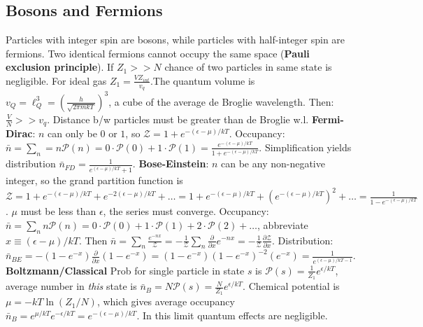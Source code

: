 \documentclass[11pt,twocolumn]{amsart}
\begin{document}
\subsection{Bosons and Fermions}
Particles with integer spin are bosons, while particles with half-integer spin are fermions. Two identical fermions cannot occupy the same space (\textbf{Pauli exclusion principle}). If $Z_1 >> N$ chance of two particles in same state is negligible. For ideal gas $Z_1 = \frac{V Z_{int}}{v_q} $.The quantum volume is $ v_Q = \ell_Q^3 = \left( \frac{h}{\sqrt{2\pi mkT}} \right)^3 $, a cube of the average de Broglie wavelength. Then: $ \frac{V}{N} >>v_q$. Distance b/w particles must be greater than de Broglie w.l.
\textbf{Fermi-Dirac}: $n$ can only be $0$ or $1$, so $\mathcal{Z} = 1 + e^{-(\epsilon-\mu)/kT}$. Occupancy: $ \bar{n} = \sum_n = n\mathcal{P}(n) = 0 \cdot \mathcal{P}(0) + 1 \cdot \mathcal{P}(1) = \frac{e^{-(\epsilon - \mu)/kT}}{1 + e^{-(\epsilon - \mu)/kT}} $. Simplification yields distribution $\bar{n}_{FD} = \frac{1}{e^{(\epsilon-\mu)/kT} + 1} $.
\textbf{Bose-Einstein}: $n$ can be any non-negative integer, so the grand partition function is $ \mathcal{Z} = 1 + e^{-(\epsilon-\mu)/kT} + e^{-2(\epsilon-\mu)/kT} + \dots = 1 + e^{-(\epsilon-\mu)/kT} + (e^{-(\epsilon-\mu)/kT})^2 + \dots = \frac{1}{1-e^{-(\epsilon-\mu)/kT}}$. $\mu$ must be less than $\epsilon$, the series must converge. Occupancy: $ \bar{n} = \sum_n n \mathcal{P}(n) = 0 \cdot \mathcal{P}(0) + 1 \cdot \mathcal{P}(1) + 2 \cdot \mathcal{P}(2) + \dots $, abbreviate $x \equiv (\epsilon-\mu)/kT$. Then $\bar{n} = \sum_n \frac{e^{-nx}}{\mathcal{Z}} = -\frac{1}{\mathcal{Z}} \sum_n \frac{\partial}{\partial x} e^{-nx} = -\frac{1}{\mathcal{Z}}\frac{\partial\mathcal{Z}}{\partial x}$. Distribution: $ \bar{n}_{BE} = -(1-e^{-x})\frac{\partial}{\partial x}(1-e^{-x}) = (1-e^{-x})(1-e^{-x})^{-2}(e^{-x}) = \frac{1}{e^{(\epsilon-\mu)/kT-1}} $.
\textbf{Boltzmann/Classical} Prob for single particle in state $s$ is $\mathcal{P}(s) = \frac{1}{Z_1}e^{\epsilon/kT}$, average number in \emph{this} state is $\bar{n}_{B} = N\mathcal{P}(s) = \frac{N}{Z_1}e^{\epsilon/kT}$. Chemical potential is $\mu = -kT\ln(Z_1/N)$, which gives average occupancy $\bar{n}_B = e^{\mu/kT}e^{-\epsilon/kT}=e^{-(\epsilon-\mu)/kT}$. In this limit quantum effects are negligible. 
\end{document}
